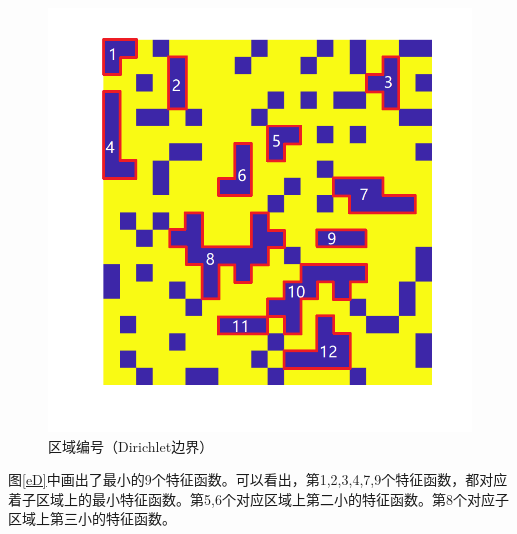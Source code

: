 \documentclass[12pt,a4paper]{article}
\begin{document}
\begin{figure}[htbp]
\centering
\includegraphics[width=0.4\linewidth]{pics/edVD}
\caption{区域编号（Dirichlet边界）}
\label{rD}
\end{figure}

图\ref{eD}中画出了最小的9个特征函数。可以看出，第1,2,3,4,7,9个特征函数，都对应着子区域上的最小特征函数。第5,6个对应区域上第二小的特征函数。第8个对应子区域上第三小的特征函数。
\end{document}
